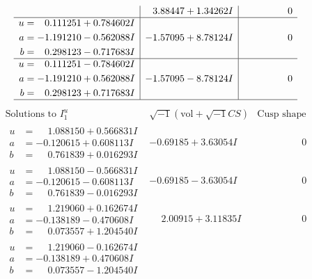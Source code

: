 \documentclass[1p]{elsarticle_modified}
\theoremstyle{definition}
\newcommand{\I}{\sqrt{-1}}
\begin{document}
$$\begin{array}{c|c|c}
 & \phantom{-}3.88447 + 1.34262 I & \phantom{-0.000000 } 0 \\ \hline\begin{aligned}
u &= \phantom{-}0.111251 + 0.784602 I \\
a &= -1.191210 - 0.562088 I \\
b &= \phantom{-}0.298123 - 0.717683 I\end{aligned}
 & -1.57095 + 8.78124 I & \phantom{-0.000000 } 0 \\ \hline\begin{aligned}
u &= \phantom{-}0.111251 - 0.784602 I \\
a &= -1.191210 + 0.562088 I \\
b &= \phantom{-}0.298123 + 0.717683 I\end{aligned}
 & -1.57095 - 8.78124 I & \phantom{-0.000000 } 0\\
 \hline 
 \end{array}$$\newpage$$\begin{array}{c|c|c}  
\text{Solutions to }I^u_{1}& \I (\text{vol} + \sqrt{-1}CS) & \text{Cusp shape}\\
 \hline 
\begin{aligned}
u &= \phantom{-}1.088150 + 0.566831 I \\
a &= -0.120615 + 0.608113 I \\
b &= \phantom{-}0.761839 + 0.016293 I\end{aligned}
 & -0.69185 + 3.63054 I & \phantom{-0.000000 } 0 \\ \hline\begin{aligned}
u &= \phantom{-}1.088150 - 0.566831 I \\
a &= -0.120615 - 0.608113 I \\
b &= \phantom{-}0.761839 - 0.016293 I\end{aligned}
 & -0.69185 - 3.63054 I & \phantom{-0.000000 } 0 \\ \hline\begin{aligned}
u &= \phantom{-}1.219060 + 0.162674 I \\
a &= -0.138189 - 0.470608 I \\
b &= \phantom{-}0.073557 + 1.204540 I\end{aligned}
 & \phantom{-}2.00915 + 3.11835 I & \phantom{-0.000000 } 0 \\ \hline\begin{aligned}
u &= \phantom{-}1.219060 - 0.162674 I \\
a &= -0.138189 + 0.470608 I \\
b &= \phantom{-}0.073557 - 1.204540 I\end{aligned}

\end{array}$$
\end{document}
